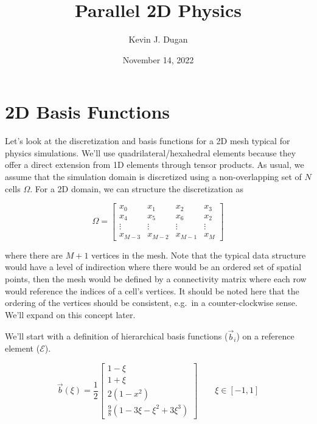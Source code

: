 \documentclass[11pt]{style/memo}
\title{Parallel 2D Physics}
\author{Kevin J. Dugan}
\date{November 14, 2022}
\begin{document}
\maketitle

\section{2D Basis Functions}
Let's look at the discretization and basis functions for a 2D mesh
typical for physics simulations. We'll use quadrilateral/hexahedral
elements because they offer a direct extension from 1D elements through
tensor products. As usual, we assume that the simulation domain is
discretized using a non-overlapping set of $N$ cells $\Omega$. For a 2D
domain, we can structure the discretization as

\begin{equation*}
    \Omega = \begin{bmatrix}
        x_0 & x_1 & x_2 & x_3 \\
        x_4 & x_5 & x_6 & x_2 \\
        \vdots & \vdots & \vdots & \vdots \\
        x_{M-3} & x_{M-2} & x_{M-1} & x_M
    \end{bmatrix}
\end{equation*}

where there are $M+1$ vertices in the mesh. Note that the typical data
structure would have a level of indirection where there would be an
ordered set of spatial points, then the mesh would be defined by a
connectivity matrix where each row would reference the indices of a cell's
vertices. It should be noted here that the ordering of the vertices
should be consistent, e.g.\ in a counter-clockwise sense. We'll expand on
this concept later.


We'll start with a definition of hierarchical basis functions ($\vec{b}_i$) on a reference
element ($\mathcal{E}$).

\begin{equation}
    \label{eq:hier1d}
    \vec{b}(\xi) = \frac{1}{2} \begin{bmatrix}
        1-\xi \\
        1+\xi \\
        2 \left( 1-x^2 \right) \\
        \frac{9}{8} \left( 1 - 3\xi - \xi^2 + 3\xi^3\right)
    \end{bmatrix}
    \qquad
    \xi \in [-1,1]
\end{equation}
\end{document}
